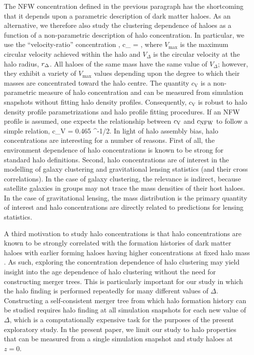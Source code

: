 \documentclass[usenatbib,fleqn]{mnras}
\begin{document}
The NFW concentration defined in the previous paragraph has the shortcoming that it depends upon a parametric description of dark matter haloes. As an alternative, we therefore also study the clustering dependence of haloes as a function of a non-parametric description of halo concentration. In particular, we use the ``velocity-ratio'' concentration \citep{prada_etal12,klypin_etal16},
%
\beq
c_{} = , 
\eeq
%
where $V_{\mathrm{max}}$ is the maximum circular velocity achieved within the halo and $V_{\Delta}$ is the circular velocity at the halo radius, $r_{\Delta}$. All haloes of the same mass have the same value of $V_{\Delta}$; however, they exhibit a variety of $V_{\mathrm{max}}$ values depending upon the degree to which their masses are concentrated toward the halo centre. The quantity $c_{\mathrm{V}}$ is a non-parametric measure of halo concentration and can be measured from simulation snapshots without fitting halo density profiles. Consequently, $c_{\mathrm{V}}$ is robust to halo density profile parametrizations and halo profile fitting procedures. If an NFW profile is assumed, one expects the relationship between $c_{\rm V}$ and $c_{\rm NFW}$ to follow a simple relation,
%
\beq
c_{\rm V} = 0.465 ^{-1/2}.
\eeq
%
In light of halo assembly bias, halo concentrations are interesting for a number of reasons. First of all, the environment dependence of halo concentrations is known to be strong for standard halo definitions. Second, halo concentrations are of interest in the modelling of galaxy clustering and gravitational lensing statistics (and their cross correlations). In the case of galaxy clustering, the relevance is indirect, because satellite galaxies in groups may not trace the mass densities of their host haloes. In the case of gravitational lensing, the mass distribution is the primary quantity of interest and halo concentrations are directly related to predictions for lensing statistics.

A third motivation to study halo concentrations is that halo concentrations are known to be strongly correlated with the formation histories of dark matter haloes with earlier forming haloes having higher concentrations at fixed halo mass \citep{wechsler_etal02, zhao_etal03, wechsler_etal06, zhao_etal09}. As such, exploring the concentration dependence of halo clustering may yield insight into the age dependence of halo clustering without the need for constructing merger trees. This is particularly important for our study in which the halo finding is performed repeatedly for many different values of $\Delta$. Constructing a self-consistent merger tree from which halo formation history can be studied requires halo finding at all simulation snapshots for each new value of $\Delta$, which is a computationally expensive task for the purposes of the present exploratory study. In the present paper, we limit our study to halo properties that can be measured from a single simulation snapshot and study haloes at $z=0$.
\end{document}
